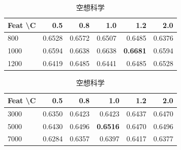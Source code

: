 \documentclass[uplatex, dvipdfmx, 11pt, a4paper, report]{jsbook}
\begin{document}
\begin{table}[H]
    \centering
    \small
    \begin{minipage}[t]{0.48\textwidth}
        \centering
        \caption{宇宙}
        \begin{tabular}{l|rrrrr}
            \hline
            Feat \textbackslash C & 0.5 & 0.8 & 1.0 & 1.2 & 2.0 \\ \hline
            800 & 0.6528 & 0.6572 & 0.6507 & 0.6485 & 0.6376 \\
            1000 & 0.6594 & 0.6638 & 0.6638 & \textbf{0.6681} & 0.6594 \\
            1200 & 0.6419 & 0.6485 & 0.6441 & 0.6485 & 0.6528 \\ \hline
        \end{tabular}
    \end{minipage}
    \hfill
    \begin{minipage}[t]{0.48\textwidth}
        \centering
        \caption{空想科学}
        \begin{tabular}{l|rrrrr}
            \hline
            Feat \textbackslash C & 0.5 & 0.8 & 1.0 & 1.2 & 2.0 \\ \hline
            3000 & 0.6350 & 0.6423 & 0.6423 & 0.6437 & 0.6470 \\
            5000 & 0.6430 & 0.6496 & \textbf{0.6516} & 0.6470 & 0.6496 \\
            7000 & 0.6284 & 0.6357 & 0.6397 & 0.6417 & 0.6377 \\ \hline
        \end{tabular}
    \end{minipage}
\end{table}
\end{document}
